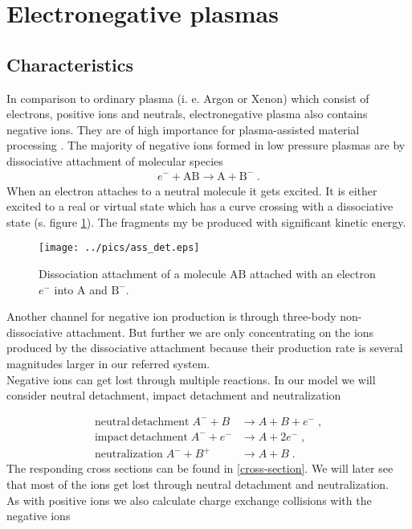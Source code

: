 \section{Electronegative plasmas}

\subsection{Characteristics}

In comparison to ordinary plasma (i. e. Argon or Xenon) which consist of electrons, positive ions and neutrals, electronegative plasma also contains 
negative ions. 
They are of high importance for plasma-assisted material processing \cite{sputter}. 
The majority of negative ions formed in low pressure plasmas are by dissociative attachment of molecular species
\begin{align}
    e^- + \mathrm{AB} \rightarrow \mathrm{A} + \mathrm{B}^- \; .
\end{align}
When an electron attaches to a neutral molecule it gets excited.
It is either excited to a real or virtual state which has a curve crossing with a dissociative state (s. figure \ref{fig:ass_det}).
The fragments my be produced with significant kinetic energy.

\begin{figure}[htbp]
    \texttt{[image: ../pics/ass\_det.eps]}
    \caption{Dissociation attachment of a molecule AB attached with an electron $e^-$ into A and $\mathrm{B}^-$.}
    \label{fig:ass_det}
\end{figure}

Another channel for negative ion production is through three-body non-dissociative attachment.
But further we are only concentrating on the ions produced by the dissociative attachment
because their production rate is several magnitudes larger in our referred system. \\
Negative ions can get lost through multiple reactions.
In our model we will consider neutral detachment, impact detachment and neutralization 

\begin{align}
    \mathrm{neutral\, detachment} \; A^- + B &\rightarrow A + B + e^- \nonumber\; , \\
    \mathrm{impact\, detachment} \; A^- + e^- &\rightarrow A + 2e^-  \; ,\\
    \mathrm{neutralization} \; A^- + B^+ &\rightarrow A + B \nonumber \; . 
\end{align}
The responding cross sections can be found in \ref{cross-section}. 
We will later see that most of the ions get lost through neutral detachment and neutralization.\\
As with positive ions we also calculate charge exchange collisions with the negative ions

